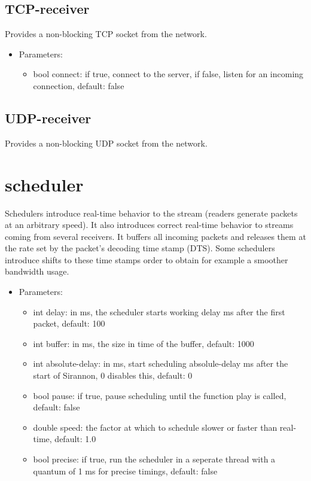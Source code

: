 \subsection{TCP-receiver}
Provides a non-blocking TCP socket from the network.
\begin{itemize}
\item Parameters:
\begin{itemize}
\item bool connect: if true, connect to the server, if false, listen for an incoming connection, default: false
\end{itemize}
\end{itemize}
\subsection{UDP-receiver}
Provides a non-blocking UDP socket from the network.
\newpage
\section{scheduler}
Schedulers introduce real-time behavior to the stream (readers generate packets at an arbitrary speed). It also introduces correct real-time behavior to streams coming from several receivers. It buffers all incoming packets and releases them at the rate set by the packet's decoding time stamp (DTS). Some schedulers introduce shifts to these time stamps order to obtain for example a smoother bandwidth usage.
\begin{itemize}
\item Parameters:
\begin{itemize}
\item int delay: in ms, the scheduler starts working delay ms after the first packet, default: 100
\item int buffer: in ms, the size in time of the buffer, default: 1000
\item int absolute-delay: in ms, start scheduling absolule-delay ms after the start of Sirannon, 0 disables this, default: 0
\item bool pause: if true, pause scheduling until the function play is called, default: false
\item double speed: the factor at which to schedule slower or faster than real-time, default: 1.0
\item bool precise: if true, run the scheduler in a seperate thread with a quantum of 1 ms for precise timings, default: false
\end{itemize}
\end{itemize}
